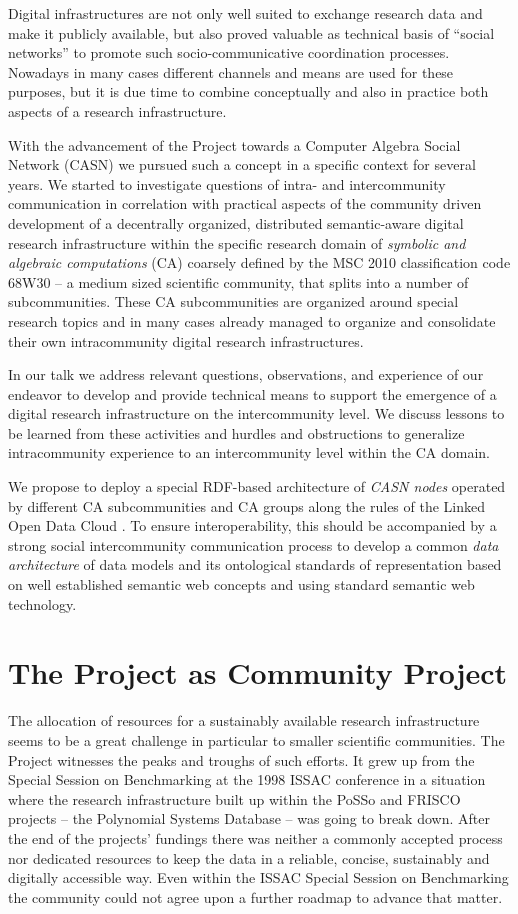 \documentclass[11pt]{article}
\begin{document}
Digital infrastructures are not only well suited to exchange research data and
make it publicly available, but also proved valuable as technical basis of
``social networks'' to promote such socio-communicative coordination processes.
Nowadays in many cases different channels and means are used for these
purposes, but it is due time to combine conceptually and also in practice both
aspects of a research infrastructure.

With the advancement of the {\SD} Project towards a Computer Algebra Social
Network (CASN) we pursued such a concept in a specific context for several
years.  We started to investigate questions of intra- and intercommunity
communication in correlation with practical aspects of the community driven
development of a decentrally organized, distributed semantic-aware digital
research infrastructure within the specific research domain of \emph{symbolic
  and algebraic computations} (CA) coarsely defined by the MSC 2010
classification code 68W30 -- a medium sized scientific community, that splits
into a number of subcommunities.  These CA subcommunities are organized around
special research topics and in many cases already managed to organize and
consolidate their own intracommunity digital research infrastructures.

In our talk we address relevant questions, observations, and experience of our
endeavor to develop and provide technical means to support the emergence of a
digital research infrastructure on the intercommunity level.  We discuss
lessons to be learned from these activities and hurdles and obstructions to
generalize intracommunity experience to an intercommunity level within the CA
domain.  

We propose to deploy a special RDF-based architecture of \emph{CASN nodes}
operated by different CA subcommunities and CA groups along the rules of the
Linked Open Data Cloud \cite{lod}.  To ensure interoperability, this should be
accompanied by a strong social intercommunity communication process to develop
a common \emph{data architecture} of data models and its ontological standards
of representation based on well established semantic web concepts and using
standard semantic web technology.

\section{The {\SD} Project as Community Project}
The allocation of resources for a sustainably available research infrastructure
seems to be a great challenge in particular to smaller scientific communities.
The {\SD} Project witnesses the peaks and troughs of such efforts. It grew up
from the Special Session on Benchmarking at the 1998 ISSAC conference in a
situation where the research infrastructure built up within the PoSSo
\cite{PoSSo} and FRISCO \cite{FRISCO} projects -- the Polynomial Systems
Database -- was going to break down. After the end of the projects' fundings
there was neither a commonly accepted process nor dedicated resources to keep
the data in a reliable, concise, sustainably and digitally accessible way. Even
within the ISSAC Special Session on Benchmarking the community could not agree
upon a further roadmap to advance that matter.
\end{document}
